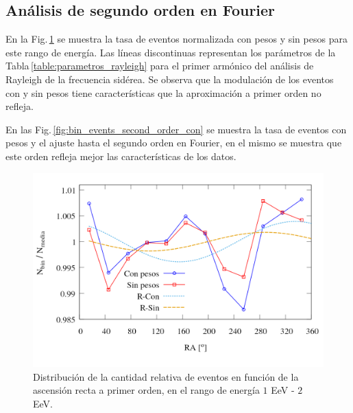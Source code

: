 \subsection{Análisis de segundo orden en Fourier}
En la Fig.\,\ref{fig:bin_events_first_order} se muestra la tasa de eventos normalizada con pesos y sin pesos para este rango de energía. Las líneas discontinuas representan los parámetros de la Tabla\,\ref{table:parametros_rayleigh} para el primer armónico del análisis de Rayleigh de la frecuencia sidérea. Se observa que la modulación de los eventos con y sin pesos tiene características que la aproximación a primer orden no refleja. 	


	En las Fig.\,\ref{fig:bin_events_second_order_con} se muestra la tasa de eventos con pesos y el ajuste hasta el segundo orden en Fourier, en el mismo se muestra que este orden refleja mejor las características de los datos. 

	\begin{figure}[H]
		\centering
		\includegraphics[width=0.7\linewidth]{eventos_clasificados_por_RA_v4.png}
		\vspace*{-0.9 cm}
		\caption{Distribución de la cantidad relativa de eventos en función de la ascensión recta a primer orden, en el rango de energía $1$ EeV - $2$ EeV.}
		\label{fig:bin_events_first_order}
	\end{figure}
	
